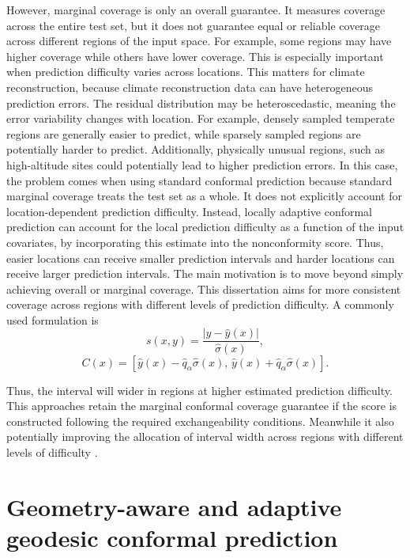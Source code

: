However, marginal coverage is only an overall guarantee. It measures coverage across the entire test set, but it does not guarantee equal or reliable coverage across different regions of the input space. For example, some regions may have higher coverage while others have lower coverage. This is especially important when prediction difficulty varies across locations. This matters for climate reconstruction, because climate reconstruction data can have heterogeneous prediction errors. The residual distribution may be heteroscedastic, meaning the error variability changes with location. For example, densely sampled temperate regions are generally easier to predict, while sparsely sampled regions are potentially harder to predict. Additionally, physically unusual regions, such as high-altitude sites could potentially lead to higher prediction errors. In this case, the problem comes when using standard conformal prediction because standard marginal coverage treats the test set as a whole. It does not explicitly account for location-dependent prediction difficulty. Instead, locally adaptive conformal prediction can account for the local prediction difficulty as a function of the input covariates, by incorporating this estimate into the nonconformity score. Thus, easier locations can receive smaller prediction intervals and harder locations can receive larger prediction intervals. The main motivation is to move beyond simply achieving overall or marginal coverage. This dissertation aims for more consistent coverage across regions with different levels of prediction difficulty. A commonly used formulation is
\begin{equation}
s(x,y) = \frac{|y-\hat y(x)|}{\hat\sigma(x)},
\label{eq:adaptive-score}
\end{equation}
\begin{equation}
C(x) =
\left[
\hat y(x)-\hat q_\alpha\hat\sigma(x),\,
\hat y(x)+\hat q_\alpha\hat\sigma(x)
\right].
\label{eq:adaptive-interval}
\end{equation}

Thus, the interval will wider in regions at higher estimated prediction difficulty. This approaches retain the marginal conformal coverage guarantee if the score is constructed following the required exchangeability conditions. Meanwhile it also potentially improving the allocation of interval width across regions with different levels of difficulty \citep{lei2018,romano2019}.


\section{Geometry-aware and adaptive geodesic conformal prediction}
\label{sec:geodesic-cp-background}


